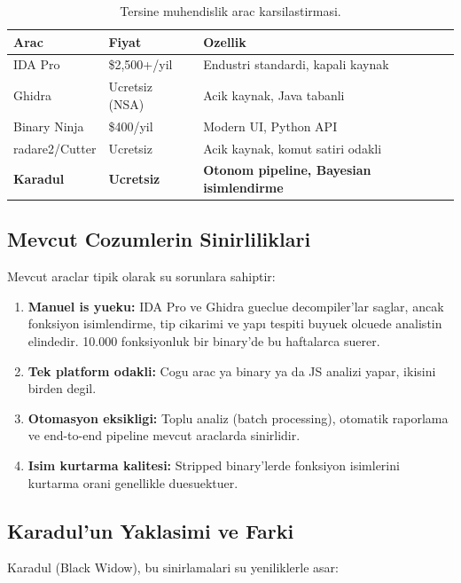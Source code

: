 \documentclass[12pt,a4paper,oneside]{book}
\theoremstyle{definition}
\begin{document}
\begin{table}[h]
\centering
\begin{tabular}{lll}
\toprule
\textbf{\color{sectioncyan}Arac} & \textbf{\color{sectioncyan}Fiyat} & \textbf{\color{sectioncyan}Ozellik} \\
\midrule
IDA Pro & \$2,500+/yil & Endustri standardi, kapali kaynak \\
Ghidra & Ucretsiz (NSA) & Acik kaynak, Java tabanli \\
Binary Ninja & \$400/yil & Modern UI, Python API \\
radare2/Cutter & Ucretsiz & Acik kaynak, komut satiri odakli \\
\textbf{Karadul} & \textbf{Ucretsiz} & \textbf{Otonom pipeline, Bayesian isimlendirme} \\
\bottomrule
\end{tabular}
\caption{Tersine muhendislik arac karsilastirmasi.}
\label{tab:re-tools}
\end{table}

\subsection{Mevcut Cozumlerin Sinirliliklari}

Mevcut araclar tipik olarak su sorunlara sahiptir:

\begin{enumerate}
\item \textbf{Manuel is yueku:} IDA Pro ve Ghidra gueclue decompiler'lar saglar, ancak fonksiyon isimlendirme, tip cikari\-mi ve yapı tespiti buyuek olcuede analistin elindedir. 10.000 fonksiyonluk bir binary'de bu haftalarca suerer.
\item \textbf{Tek platform odakli:} Cogu arac ya binary ya da JS analizi yapar, ikisini birden degil.
\item \textbf{Otomasyon eksikligi:} Toplu analiz (batch processing), otomatik raporlama ve end-to-end pipeline mevcut araclarda sinirlidir.
\item \textbf{Isim kurtarma kalitesi:} Stripped binary'lerde fonksiyon isimlerini kurtarma orani genellikle duesuektuer.
\end{enumerate}

\subsection{Karadul'un Yaklasimi ve Farki}
\label{sec:karadul-fark}

Karadul (Black Widow), bu sinirlamalari su yeniliklerle asar:
\end{document}
